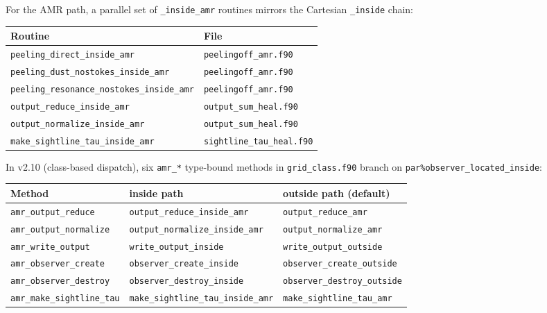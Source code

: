 \documentclass[english,a4paper]{my_memo}
\begin{document}
For the AMR path, a parallel set of \texttt{\_inside\_amr} routines
mirrors the Cartesian \texttt{\_inside} chain:
\begin{center}
{\small
\begin{tabular}{ll}
\hline
Routine                                        & File \\
\hline
\texttt{peeling\_direct\_inside\_amr}          & \texttt{peelingoff\_amr.f90} \\
\texttt{peeling\_dust\_nostokes\_inside\_amr}  & \texttt{peelingoff\_amr.f90} \\
\texttt{peeling\_resonance\_nostokes\_inside\_amr} & \texttt{peelingoff\_amr.f90} \\
\texttt{output\_reduce\_inside\_amr}           & \texttt{output\_sum\_heal.f90} \\
\texttt{output\_normalize\_inside\_amr}        & \texttt{output\_sum\_heal.f90} \\
\texttt{make\_sightline\_tau\_inside\_amr}     & \texttt{sightline\_tau\_heal.f90} \\
\hline
\end{tabular}
}
\end{center}

\begin{sloppypar}
In v2.10 (class-based dispatch), six \texttt{amr\_*} type-bound methods
in \texttt{grid\_class.f90} branch on \texttt{par\%observer\_located\_inside}:
\end{sloppypar}
\begin{center}
{\small
\begin{tabular}{lll}
\hline
Method                       & inside path & outside path (default) \\
\hline
\texttt{amr\_output\_reduce}     & \texttt{output\_reduce\_inside\_amr}    & \texttt{output\_reduce\_amr} \\
\texttt{amr\_output\_normalize}  & \texttt{output\_normalize\_inside\_amr} & \texttt{output\_normalize\_amr} \\
\texttt{amr\_write\_output}      & \texttt{write\_output\_inside}          & \texttt{write\_output\_outside} \\
\texttt{amr\_observer\_create}   & \texttt{observer\_create\_inside}       & \texttt{observer\_create\_outside} \\
\texttt{amr\_observer\_destroy}  & \texttt{observer\_destroy\_inside}      & \texttt{observer\_destroy\_outside} \\
\texttt{amr\_make\_sightline\_tau} & \texttt{make\_sightline\_tau\_inside\_amr} & \texttt{make\_sightline\_tau\_amr} \\
\hline
\end{tabular}
}
\end{center}
\end{document}
